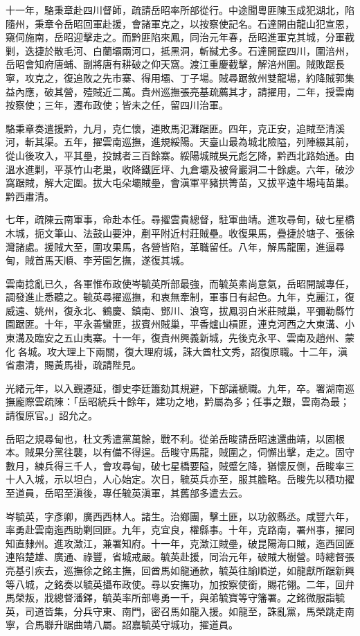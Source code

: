 \begin{pinyinscope}
十一年，駱秉章赴四川督師，疏請岳昭率所部從行。中途聞粵匪陳玉成犯湖北，陷隨州，秉章令岳昭回軍赴援，會諸軍克之，以按察使記名。石達開由龍山犯宣恩，窺伺施南，岳昭迎擊走之。而黔匪陷來鳳，同治元年春，岳昭進軍克其城，分軍截剿，迭捷於散毛河、白蘭壩兩河口，抵黑洞，斬馘尤多。石達開竄四川，圍涪州，岳昭會知府唐蜅、副將唐有耕破之仰天窩。渡江重慶截擊，解涪州圍。賊敗踞長寧，攻克之，復追敗之先市寨、得用壩、丁子場。賊尋踞敘州雙龍場，約降賊郭集益內應，破其營，殪賊近二萬。貴州巡撫張亮基疏薦其才，請擢用，二年，授雲南按察使；三年，遷布政使；皆未之任，留四川治軍。

駱秉章奏遣援黔，九月，克仁懷，連敗馬氾灘踞匪。四年，克正安，追賊至清溪河，斬其渠。五年，擢雲南巡撫，進規綏陽。天臺山最為城北險隘，列陣綴其前，從山後攻入，平其壘，投誠者三百餘寨。綏陽城賊吳元彪乞降，黔西北路始通。由溫水進剿，平菉竹山老巢，收降鐵匠坪、九倉壩及被脅巖洞二十餘處。六年，破沙窩踞賊，解大定圍。拔大屯朵壩賊壘，會滇軍平豬拱箐苗，又拔平遠牛場坉苗巢。黔西肅清。

七年，疏陳云南軍事，命赴本任。尋擢雲貴總督，駐軍曲靖。進攻尋甸，破七星橋木城，扼文筆山、法鼓山要沖，剷平附近村莊賊壘。收復果馬，疊捷於塘子、張徐灣諸處。援賊大至，圍攻果馬，各營皆陷，革職留任。八年，解馬龍圍，進逼尋甸，賊首馬天順、李芳園乞撫，遂復其城。

雲南捻亂已久，各軍惟布政使岑毓英所部最強，而毓英素尚意氣，岳昭開誠專任，調發進止悉聽之。毓英尋擢巡撫，和衷無牽制，軍事日有起色。九年，克麗江，復威遠、姚州，復永北、鶴慶、鎮南、鄧川、浪穹，拔鳳羽白米莊賊巢，平彌勒縣竹園踞匪。十年，平永善蠻匪，拔賓州賊巢，平香爐山槓匪，連克河西之大東溝、小東溝及臨安之五山夷寨。十一年，復貴州興義新城，先後克永平、雲南及趙州、蒙化各城。攻大理上下兩關，復大理府城，誅大酋杜文秀，詔復原職。十二年，滇省肅清，賜黃馬褂，疏請陛見。

光緒元年，以入覲遷延，御史李廷簫劾其規避，下部議褫職。九年，卒。署湖南巡撫龐際雲疏陳：「岳昭統兵十餘年，建功之地，黔屬為多；任事之艱，雲南為最；請復原官。」詔允之。

岳昭之規尋甸也，杜文秀遣黨萬餘，戰不利。從弟岳晙請岳昭速還曲靖，以固根本。賊果分黨往襲，以有備不得逞。岳晙守馬龍，賊圍之，伺懈出擊，走之。固守數月，練兵得三千人，會攻尋甸，破七星橋要隘，賊蹙乞降，猶懷反側，岳晙率三十人入城，示以坦白，人心始定。次日，毓英兵亦至，服其膽略。岳晙先以積功擢至道員，岳昭至滇後，專任毓英滇軍，其舊部多遣去云。

岑毓英，字彥卿，廣西西林人。諸生。治鄉團，擊土匪，以功敘縣丞。咸豐六年，率勇赴雲南迤西助剿回匪。九年，克宜良，權縣事。十年，克路南，署州事，擢同知直隸州。進攻澂江，兼署知府。十一年，克澂江賊壘，破昆陽海口賊，迤西回匪連陷楚雄、廣通、祿豐，省城戒嚴。毓英赴援，同治元年，破賊大樹營。時總督張亮基引疾去，巡撫徐之銘主撫，回酋馬如龍通款，毓英往諭順逆，如龍獻所踞新興等八城，之銘奏以毓英攝布政使。尋以安撫功，加按察使銜，賜花翎。二年，回弁馬榮叛，戕總督潘鐸，毓英率所部粵勇一千，與弟毓寶等守籓署。之銘微服詣毓英，司道皆集，分兵守東、南門，密召馬如龍入援。如龍至，誅亂黨，馬榮跳走南寧，合馬聯升踞曲靖八屬。詔嘉毓英守城功，擢道員。


\end{pinyinscope}
